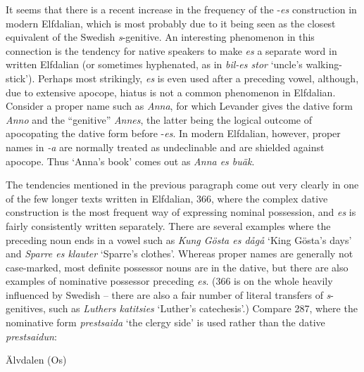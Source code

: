 \begin{styleBodyTextFirst}
It seems that there is a recent increase in the frequency of the \nobreakdash-\textit{es} construction in modern Elfdalian, which is most probably due to it being seen as the closest equivalent of the Swedish \textit{s}{}-genitive. An interesting phenomenon in this connection is the tendency for native speakers to make \textit{es} a separate word in written Elfdalian (or sometimes hyphenated, as in \textit{bil-es stor} ‘uncle’s walking-stick’). Perhaps most strikingly, \textit{es} is even used after a preceding vowel, although, due to extensive apocope, hiatus is not a common phenomenon in Elfdalian. Consider a proper name such as \textit{Anna}, for which Levander gives the dative form \textit{Anno} and the “genitive” \textit{Annes}, the latter being the logical outcome of apocopating the dative form before -\textit{es}. In modern Elfdalian, however, proper names in\textit{ -a} are normally treated as undeclinable and are shielded against apocope. Thus ‘Anna’s book’ comes out as \textit{Anna es buäk}. 

\end{styleBodyTextFirst}

\begin{styleBodytextC}
The tendencies mentioned in the previous paragraph come out very clearly in one of the few longer texts written in Elfdalian, 366, where the complex dative construction is the most frequent way of expressing nominal possession, and \textit{es} is fairly consistently written separately. There are several examples where the preceding noun ends in a vowel such as \textit{Kung Gösta es dågå} ‘King Gösta’s days’ and \textit{Sparre es klauter} ‘Sparre’s clothes’. Whereas proper names are generally not case-marked, most definite possessor nouns are in the dative, but there are also examples of nominative possessor preceding \textit{es}. (366 is on the whole heavily influenced by Swedish – there are also a fair number of literal transfers of \textit{s}{}-genitives, such as\textit{ Luthers katitsies} ‘Luther’s catechesis’.) Compare 287, where the nominative form \textit{prestsaida} ‘the clergy side’ is used rather than the dative \textit{prestsaidun}:

\end{styleBodytextC}


\begin{listWWNumileveli}
\item {}

\begin{styleExample}
\label{bkm:Ref135470135}Älvdalen (Os)

\end{styleExample}

\end{listWWNumileveli}

